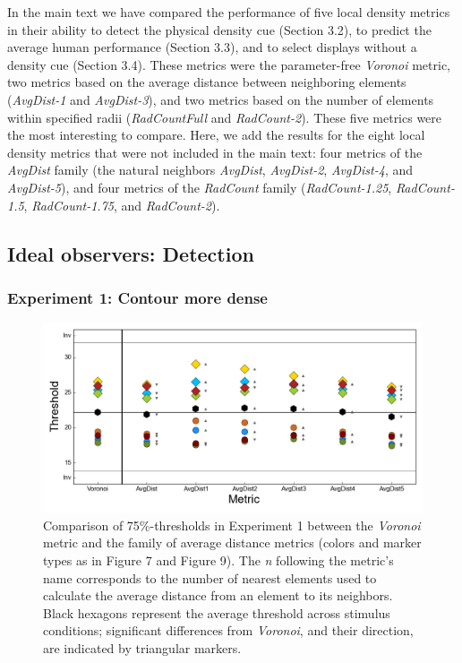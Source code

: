 \documentclass[12pt]{article}
\begin{document}
In the main text we have compared the performance of five local density metrics in their ability to detect the physical density cue (Section 3.2), to predict the average human performance (Section 3.3), and to select displays without a density cue (Section 3.4). These metrics were the parameter-free \textit{Voronoi} metric, two metrics based on the average distance between neighboring elements (\textit{AvgDist-1} and \textit{AvgDist-3}), and two metrics based on the number of elements within specified radii (\textit{RadCountFull} and \textit{RadCount-2}). These five metrics were the most interesting to compare. Here, we add the results for the eight local density metrics that were not included in the main text: four metrics of the \textit{AvgDist} family (the natural neighbors \textit{AvgDist}, \textit{AvgDist-2}, \textit{AvgDist-4}, and \textit{AvgDist-5}), and four metrics of the \textit{RadCount} family (\textit{RadCount-1.25}, \textit{RadCount-1.5}, \textit{RadCount-1.75}, and \textit{RadCount-2}).

\subsection{Ideal observers: Detection}
\subsubsection{Experiment 1: Contour more dense}

\begin{figure}[h!t]
\includegraphics{Figures/FIG_SUP_detect_series_AvgDist_exp1.png}
\caption{Comparison of 75\%-thresholds in Experiment 1 between the \emph{Voronoi} metric and the family of average distance metrics (colors and marker types as in Figure 7 and Figure 9). The \emph{n} following the metric's name corresponds to the number of nearest elements used to calculate the average distance from an element to its neighbors. Black hexagons represent the average threshold across stimulus conditions; significant differences from \emph{Voronoi}, and their  direction, are indicated by triangular markers.}
\label{fig_detect_series_AvgDist_exp1}
\end{figure}
\end{document}
